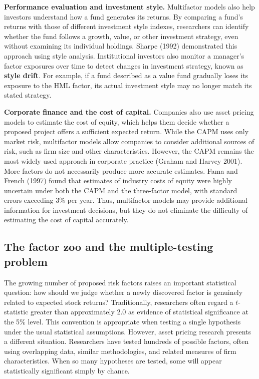 \textbf{Performance evaluation and investment style.}
Multifactor models also help investors understand how a fund
generates its returns. By comparing a fund's returns with those
of different investment style indexes, researchers can identify
whether the fund follows a growth, value, or other investment
strategy, even without examining its individual holdings.
Sharpe (1992) demonstrated this approach using style analysis.
Institutional investors also monitor a manager's factor exposures
over time to detect changes in investment strategy, known as
\textbf{style drift}. For example, if a
fund described as a value fund gradually loses its exposure to
the HML factor, its actual investment style may no longer match
its stated strategy.

\textbf{Corporate finance and the cost of capital.}
Companies also use asset pricing models to estimate the cost of
equity, which helps them decide whether a proposed project offers
a sufficient expected return. While the CAPM uses only market
risk, multifactor models allow companies to consider additional
sources of risk, such as firm size and other characteristics.
However, the CAPM remains the most widely used approach in
corporate practice (Graham and Harvey 2001). More factors do not
necessarily produce more accurate estimates. Fama and French
(1997) found that estimates of industry costs of equity were
highly uncertain under both the CAPM and the three-factor model,
with standard errors exceeding 3\% per year. Thus, multifactor
models may provide additional information for investment
decisions, but they do not eliminate the difficulty of estimating
the cost of capital accurately.


\subsection{The factor zoo and the multiple-testing problem}
\label{sec:03-multiple-testing}

The growing number of proposed risk factors raises an important
statistical question: how should we judge whether a newly discovered
factor is genuinely related to expected stock returns? Traditionally,
researchers often regard a $t$-statistic greater than approximately
2.0 as evidence of statistical significance at the 5\% level. This
convention is appropriate when testing a single hypothesis under the
usual statistical assumptions. However, asset pricing research
presents a different situation. Researchers have tested hundreds
of possible factors, often using overlapping data, similar
methodologies, and related measures of firm characteristics. When
so many hypotheses are tested, some will appear statistically
significant simply by chance.

